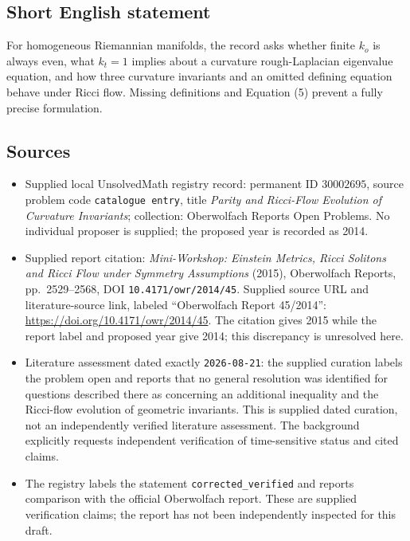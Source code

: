 \documentclass[11pt]{article}
\begin{document}
\subsection{Short English statement}
For homogeneous Riemannian manifolds, the record asks whether finite \(k_o\) is always even, what \(k_t=1\) implies about a curvature rough-Laplacian eigenvalue equation, and how three curvature invariants and an omitted defining equation behave under Ricci flow. Missing definitions and Equation (5) prevent a fully precise formulation.
\subsection{Sources}
\begin{itemize}
\item Supplied local UnsolvedMath registry record: permanent ID \(30002695\), source problem code \texttt{catalogue entry}, title \emph{Parity and Ricci-Flow Evolution of Curvature Invariants}; collection: Oberwolfach Reports Open Problems. No individual proposer is supplied; the proposed year is recorded as 2014.
\item Supplied report citation: \emph{Mini-Workshop: Einstein Metrics, Ricci Solitons and Ricci Flow under Symmetry Assumptions} (2015), Oberwolfach Reports, pp.\ 2529--2568, DOI \texttt{10.4171/owr/2014/45}. Supplied source URL and literature-source link, labeled ``Oberwolfach Report 45/2014'': \url{https://doi.org/10.4171/owr/2014/45}. The citation gives 2015 while the report label and proposed year give 2014; this discrepancy is unresolved here.
\item Literature assessment dated exactly \texttt{2026-08-21}: the supplied curation labels the problem open and reports that no general resolution was identified for questions described there as concerning an additional inequality and the Ricci-flow evolution of geometric invariants. This is supplied dated curation, not an independently verified literature assessment. The background explicitly requests independent verification of time-sensitive status and cited claims.
\item The registry labels the statement \texttt{corrected\_verified} and reports comparison with the official Oberwolfach report. These are supplied verification claims; the report has not been independently inspected for this draft.
\end{itemize}
\end{document}
